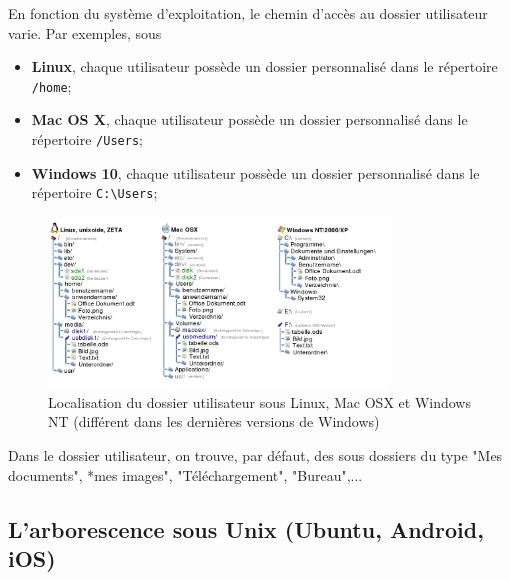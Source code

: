 En fonction du système d'exploitation, le chemin d'accès au dossier utilisateur varie. Par exemples, sous
\begin{itemize}
	\item \textbf{Linux}, chaque utilisateur possède un dossier personnalisé dans le répertoire \lstinline{/home};
	\item \textbf{Mac OS X}, chaque utilisateur possède un dossier personnalisé dans le répertoire \lstinline{/Users};
	\item \textbf{Windows 10}, chaque utilisateur possède un dossier personnalisé dans le répertoire \lstinline{C:\Users};
\end{itemize}
\begin{figure}[h!]
	\centering
	\includegraphics[trim=0 0 0 0,width=0.8\textwidth]{Images/OS/dossier_home.png}
	\caption{Localisation du dossier utilisateur sous Linux, Mac OSX et Windows NT (différent dans les dernières versions de Windows) }
\end{figure}
Dans le dossier utilisateur, on trouve, par défaut, des sous dossiers du type "Mes documents", *mes images", "Téléchargement", "Bureau",...

\subsection{L'arborescence sous Unix (Ubuntu, Android, iOS)}

